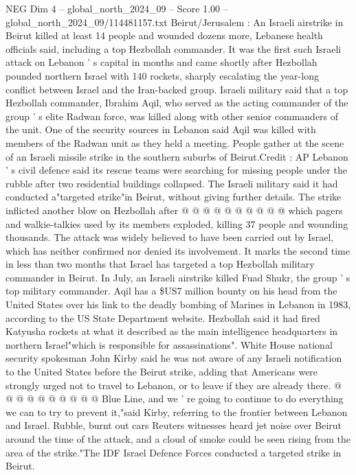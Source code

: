 \begin{textsample}{NEG Dim 4 – global\_north\_2024\_09 – Score 1.00 – global\_north\_2024\_09/114481157.txt}  \label{ex:f4_neg_140}
Beirut/Jerusalem : An Israeli airstrike in Beirut killed at least 14 people and wounded dozens more, Lebanese health officials said, including a top Hezbollah commander.
It was the first such Israeli attack on Lebanon ' s capital in months and came shortly after Hezbollah pounded northern Israel with 140 rockets, sharply escalating the year-long conflict between Israel and the Iran-backed group.
Israeli military said that a top Hezbollah commander, Ibrahim Aqil, who served as the acting commander of the group ' s elite Radwan force, was killed along with other senior commanders of the unit.
One of the security sources in Lebanon said Aqil was killed with members of the Radwan unit as they held a meeting.
People gather at the scene of an Israeli missile strike in the southern suburbs of Beirut.Credit : AP Lebanon ' s civil defence said its rescue teams were searching for missing people under the rubble after two residential buildings collapsed.
The Israeli military said it had conducted a"targeted strike"in Beirut, without giving further details.
The strike inflicted another blow on Hezbollah after @ @ @ @ @ @ @ @ @ @ which pagers and walkie-talkies used by its members exploded, killing 37 people and wounding thousands.
The attack was widely believed to have been carried out by Israel, which has neither confirmed nor denied its involvement.
It marks the second time in less than two months that Israel has targeted a top Hezbollah military commander in Beirut.
In July, an Israeli airstrike killed Fuad Shukr, the group ' s top military commander.
Aqil has a \$US7 million bounty on his head from the United States over his link to the deadly bombing of Marines in Lebanon in 1983, according to the US State Department website.
Hezbollah said it had fired Katyusha rockets at what it described as the main intelligence headquarters in northern Israel"which is responsible for assassinations".
White House national security spokesman John Kirby said he was not aware of any Israeli notification to the United States before the Beirut strike, adding that Americans were strongly urged not to travel to Lebanon, or to leave if they are already there. @ @ @ @ @ @ @ @ @ @ Blue Line, and we ' re going to continue to do everything we can to try to prevent it,"said Kirby, referring to the frontier between Lebanon and Israel.
Rubble, burnt out cars Reuters witnesses heard jet noise over Beirut around the time of the attack, and a cloud of smoke could be seen rising from the area of the strike."The IDF Israel Defence Forces conducted a targeted strike in Beirut.

\end{textsample}
